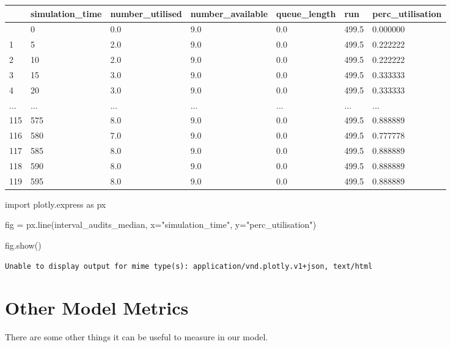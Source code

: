 \documentclass[
  letterpaper,
  DIV=11,
  numbers=noendperiod]{scrreprt}
\newenvironment{Shaded}{\begin{snugshade}}{\end{snugshade}}
\newcommand{\ImportTok}[1]{\textcolor[rgb]{0.00,0.46,0.62}{#1}}
\newcommand{\NormalTok}[1]{\textcolor[rgb]{0.00,0.23,0.31}{#1}}
\newcommand{\OperatorTok}[1]{\textcolor[rgb]{0.37,0.37,0.37}{#1}}
\newcommand{\StringTok}[1]{\textcolor[rgb]{0.13,0.47,0.30}{#1}}
\begin{document}
\begin{longtable}[]{@{}lllllll@{}}
\toprule\noalign{}
& simulation\_time & number\_utilised & number\_available &
queue\_length & run & perc\_utilisation \\
\midrule\noalign{}
\endhead
\bottomrule\noalign{}
\endlastfoot
0 & 0 & 0.0 & 9.0 & 0.0 & 499.5 & 0.000000 \\
1 & 5 & 2.0 & 9.0 & 0.0 & 499.5 & 0.222222 \\
2 & 10 & 2.0 & 9.0 & 0.0 & 499.5 & 0.222222 \\
3 & 15 & 3.0 & 9.0 & 0.0 & 499.5 & 0.333333 \\
4 & 20 & 3.0 & 9.0 & 0.0 & 499.5 & 0.333333 \\
... & ... & ... & ... & ... & ... & ... \\
115 & 575 & 8.0 & 9.0 & 0.0 & 499.5 & 0.888889 \\
116 & 580 & 7.0 & 9.0 & 0.0 & 499.5 & 0.777778 \\
117 & 585 & 8.0 & 9.0 & 0.0 & 499.5 & 0.888889 \\
118 & 590 & 8.0 & 9.0 & 0.0 & 499.5 & 0.888889 \\
119 & 595 & 8.0 & 9.0 & 0.0 & 499.5 & 0.888889 \\
\end{longtable}

\begin{Shaded}
\begin{Highlighting}[]
\ImportTok{import}\NormalTok{ plotly.express }\ImportTok{as}\NormalTok{ px}

\NormalTok{fig }\OperatorTok{=}\NormalTok{ px.line(interval\_audits\_median, x}\OperatorTok{=}\StringTok{"simulation\_time"}\NormalTok{, y}\OperatorTok{=}\StringTok{"perc\_utilisation"}\NormalTok{)}

\NormalTok{fig.show()}
\end{Highlighting}
\end{Shaded}

\begin{verbatim}
Unable to display output for mime type(s): application/vnd.plotly.v1+json, text/html
\end{verbatim}

\chapter{Other Model Metrics}\label{other-model-metrics}

There are some other things it can be useful to measure in our model.
\end{document}
